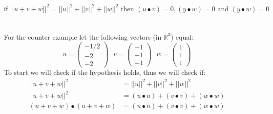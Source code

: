 \documentclass[11pt]{article}
\begin{document}
\[ \text{if } ||u + v + w||^2 = ||u||^2 + ||v||^2 + ||w||^2 \text{ then } (u \bullet v) = 0, (y \bullet w) = 0 \text{ and } (y \bullet w) = 0 \]\\\\
 For the counter example let the following vectors (in $\mathbb{R}^3$) equal:
\begin{equation*}
u = 
\begin{pmatrix}
-1/2 \\
-2\\
-2
\end{pmatrix}
\text{  }v =
\begin{pmatrix}
-1 \\
-1\\
-1
\end{pmatrix}
\text{  } w =
\begin{pmatrix}
1 \\
1\\
1
\end{pmatrix}
\end{equation*}
To start we will check if the hypothesis holds, thus we will check if:
\begin{align*}
||u+v +w||^2   &= ||u||^2 + ||v||^2 + ||w||^2 \\
||u+v +w||^2 &=  (u \bullet u) + (v \bullet v) + (w \bullet w)\\
(u+v+w) \bullet (u+v +w) &=  (u \bullet u) + (v \bullet v) + (w \bullet w)\\
\end{align*}
\end{document}
